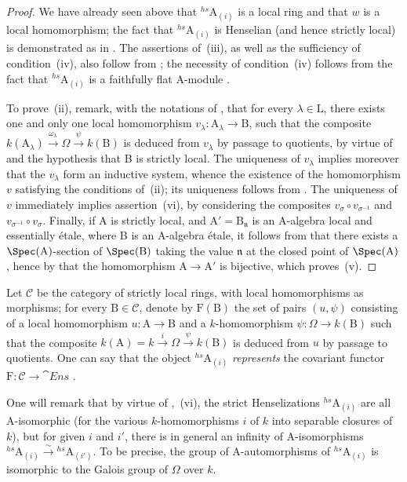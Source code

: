 \begin{proof}
We have already seen above that ${}^{hs}\!\mathrm{A}_{(i)}$ is a local ring and that $w$ is a local homomorphism;
the fact that ${}^{hs}\!\mathrm{A}_{(i)}$ is Henselian (and hence strictly local) is demonstrated as in .
The assertions of~(iii), as well as the sufficiency of condition~(iv), also follow from ; the necessity of condition~(iv) follows from the fact that ${}^{hs}\!\mathrm{A}_{(i)}$ is a faithfully flat A-module .

To prove~(ii), remark, with the notations of , that for every $\lambda\in\mathrm{L}$, there exists one and only one local homomorphism $v_\lambda:\mathrm{A}_\lambda\to\mathrm{B}$, such that the composite $k(\mathrm{A}_\lambda)\xrightarrow{\omega_\lambda}\Omega\xrightarrow{\psi}k(\mathrm{B})$ is deduced from $v_\lambda$ by passage to quotients, by virtue of  and the hypothesis that B is strictly local.
The uniqueness of $v_\lambda$ implies moreover that the $v_\lambda$ form an inductive system, whence the existence of the homomorphism $v$ satisfying the conditions of~(ii); its uniqueness follows from .
The uniqueness of $v$ immediately implies assertion~(vi), by considering the composites $v_\sigma\circ v_{\sigma^{-1}}$ and $v_{\sigma^{-1}}\circ v_\sigma$.
Finally, if A is strictly local, and $\mathrm{A}'=\mathrm{B}_{\mathfrak{n}}$ is an A-algebra local and essentially \'{e}tale, where B is an A-algebra \'{e}tale, it follows from  that there exists a $\Spec(\mathrm{A})$-section of $\Spec(\mathrm{B})$ taking the value $\mathfrak{n}$ at the closed point of $\Spec(\mathrm{A})$, hence by  that the homomorphism $\mathrm{A}\to\mathrm{A}'$ is bijective, which proves~(v).
\end{proof}

\begin{env}[18.8.8.1]
\label{IV.18.8.8.1}
Let $\mathcal{C}$ be the category of strictly local rings, with local homomorphisms as morphisms;
for every $\mathrm{B}\in\mathcal{C}$, denote by $\mathrm{F}(\mathrm{B})$ the set of pairs $(u,\psi)$ consisting of a local homomorphism $u:\mathrm{A}\to\mathrm{B}$ and a $k$-homomorphism $\psi:\Omega\to k(\mathrm{B})$ such that the composite $k(\mathrm{A})=k\xrightarrow{i}\Omega\xrightarrow{\psi}k(\mathrm{B})$ is deduced from $u$ by passage to quotients.
One can say that the object ${}^{hs}\!\mathrm{A}_{(i)}$ \emph{represents} the covariant functor $\mathrm{F}:\mathcal{C}\to\cat{Ens}$ .

One will remark that by virtue of ,~(vi), the strict Henselizations ${}^{hs}\!\mathrm{A}_{(i)}$ are all A-isomorphic (for the various $k$-homomorphisms $i$ of $k$ into separable closures of $k$), but for given $i$ and $i'$, there is in general an infinity of A-isomorphisms ${}^{hs}\!\mathrm{A}_{(i)}\xrightarrow{\sim}{}^{hs}\!\mathrm{A}_{(i')}$.
To be precise, the group of A-automorphisms of ${}^{hs}\!\mathrm{A}_{(i)}$ is isomorphic to the Galois group of $\Omega$ over $k$.
\end{env}

